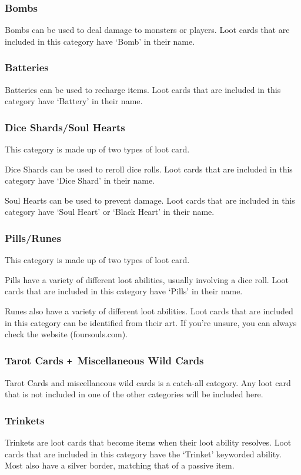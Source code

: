 \documentclass[10pt, a4paper, twoside]{article} %
\def\plus{\texttt{+}}
\begin{document}
    \subsubsection*{Bombs}
    Bombs can be used to deal damage to monsters or players. Loot cards that are included in this category have ‘Bomb’ in their name.
    \subsubsection*{Batteries}
    Batteries can be used to recharge items. Loot cards that are included in this category have ‘Battery’ in their name.
    \subsubsection*{Dice Shards/Soul Hearts}
    This category is made up of two types of loot card.
    
    Dice Shards can be used to reroll dice rolls. Loot cards that are included in this category have ‘Dice Shard’ in their name.
    
    Soul Hearts can be used to prevent damage. Loot cards that are included in this category have ‘Soul Heart’ or ‘Black Heart’ in their name.
    \subsubsection*{Pills/Runes}
    This category is made up of two types of loot card.
    
    Pills have a variety of different loot abilities, usually involving a dice roll. Loot cards that are included in this category have ‘Pills’ in their name.
    
    Runes also have a variety of different loot abilities. Loot cards that are included in this category can be identified from their art. If you’re unsure, you can always check the website (foursouls.com).
    \subsubsection*{Tarot Cards \plus\ Miscellaneous Wild Cards}
    Tarot Cards and miscellaneous wild cards is a catch-all category. Any loot card that is not included in one of the other categories will be included here.
    \subsubsection*{Trinkets}
    Trinkets are loot cards that become items when their loot ability resolves. Loot cards that are included in this category have the ‘Trinket’ keyworded ability. Most also have a silver border, matching that of a passive item.
\end{document}
